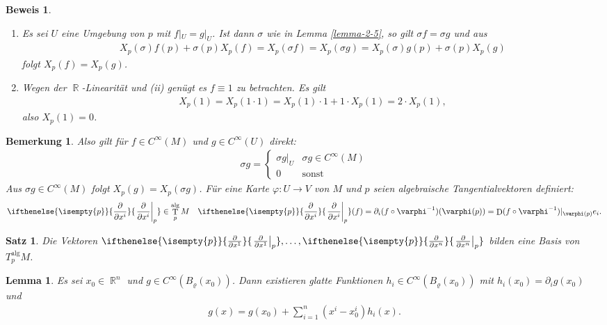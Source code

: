 \documentclass[paper=A4, twoside, chapterprefix=true, bibliography=totoc, headsepline]{scrbook}
\let\temp\phi{}
\let\phi\varphi{}
\let\varphi\temp{}
\let\temp\theta{}
\let\theta\vartheta{}
\let\vartheta\temp{}
\let\temp\epsilon{}
\let\epsilon\varepsilon{}
\let\varepsilon\temp{}
\let\temp\rho{}
\let\rho\varrho{}
\let\varrho\temp{}
\DeclareMathOperator{\R}{\mathbb{R}}
\DeclareMathOperator{\D}{D}         %
\DeclareMathOperator{\T}{T}         %
\newcommand{\pdifffrac}[3][]{\ifthenelse{\isempty{#1}}{\frac{\partial #2}{\partial #3}}{\left. \frac{\partial #2}{\partial #3} \right|_{#1}}}
\theoremstyle{plain}
\newtheorem{Satz}[Dfn]{Satz}
\newtheorem{Lemma}[Dfn]{Lemma}
\theoremstyle{nonumberplain}
\newtheorem{bem}{Bemerkung}
\newtheorem{bew}{Beweis}
\theoremstyle{empty}
\theoremstyle{break}
\begin{document}
\begin{bew}\begin{enumerate}[label=(\roman*),widest=ii,leftmargin=*]
\item[(ii)]
	Es sei $U$ eine Umgebung von $p$ mit $f|_U = g|_U$. Ist dann $\sigma$ wie in Lemma \ref{lemma-2-5}, so gilt $\sigma f = \sigma g$ und aus
	\begin{align*}
		X_p(\sigma)f(p)+\sigma(p)X_p(f) = X_{p}(\sigma f) = X_p(\sigma g) = X_p(\sigma) g(p) + \sigma(p) X_p(g)
	\end{align*}
	folgt $X_p(f) = X_p(g)$.\\
\item[(i)]
	Wegen der $\R$-Linearit\"at und (ii) gen\"ugt es $f \equiv 1$ zu betrachten. Es gilt
	\begin{align*}
		X_p(1) = X_p(1 \cdot 1) = X_p(1) \cdot 1 + 1 \cdot X_p(1) = 2 \cdot X_p(1),
	\end{align*}
	also $X_p(1) = 0$.
\end{enumerate}\end{bew}

\begin{bem}
  Also gilt f\"ur $f \in C^{\infty}(M)$ und $g \in C^{\infty}(U)$ direkt:
  \begin{align*}
    \sigma g =
    \begin{cases}
      \sigma g|_U & \sigma g \in C^{\infty}(M)\\
      0 & \text{sonst}
    \end{cases}
  \end{align*}
  Aus $\sigma g \in C^{\infty}(M)$ folgt $X_p(g) = X_p(\sigma g)$.
  F\"ur eine Karte $\phi \colon U \to V$ von $M$ und $p$ seien algebraische Tangentialvektoren definiert:
  \begin{align*}
    \pdifffrac[p]{}{x^i} \in \T_p^{\text{alg}}M && \pdifffrac[p]{}{x^i}(f) = \partial_i(f \circ \phi^{-1})(\phi(p)) = \D(f \circ \phi^{-1})|_{\phi(p)}e_i.
  \end{align*}
\end{bem}

\begin{Satz}\label{satz-2-7}
  Die Vektoren $\pdifffrac[p]{}{x^1},\ldots,\pdifffrac[p]{}{x^n}$ bilden eine Basis von $T_p^{\text{alg}}M$.
\end{Satz}

\begin{Lemma}
  Es sei $x_0 \in \R^n$ und $g \in C^{\infty}(B_{\rho}(x_0))$.
  Dann existieren glatte Funktionen $h_i \in C^{\infty}(B_{\rho}(x_0))$ mit $h_i(x_0) = \partial_ig(x_0)$ und 
  \begin{align*}
    g(x) = g(x_0) + \sum_{i=1}^n(x^i-x_0^i)h_i(x).
  \end{align*}
\end{Lemma}
\end{document}
